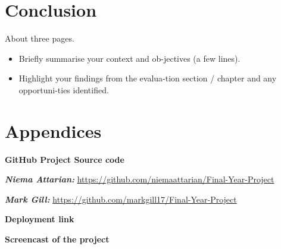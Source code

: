 \chapter{Conclusion}
About three pages.

\begin{itemize}
\item Briefly summarise your context and ob-jectives (a few lines).
\item Highlight your findings from the evalua-tion section / chapter and any opportuni-ties identified.
\end{itemize}

\chapter{Appendices}

\textbf{GitHub Project Source code}

\textit{\textbf{Niema Attarian:}} \href{https://github.com/niemaattarian/Final-Year-Project}{https://github.com/niemaattarian/Final-Year-Project}

\textit{\textbf{Mark Gill:}} \href{https://github.com/markgill17/Final-Year-Project}{https://github.com/markgill17/Final-Year-Project}

\textbf{Deployment link}

\textbf{Screencast of the project}